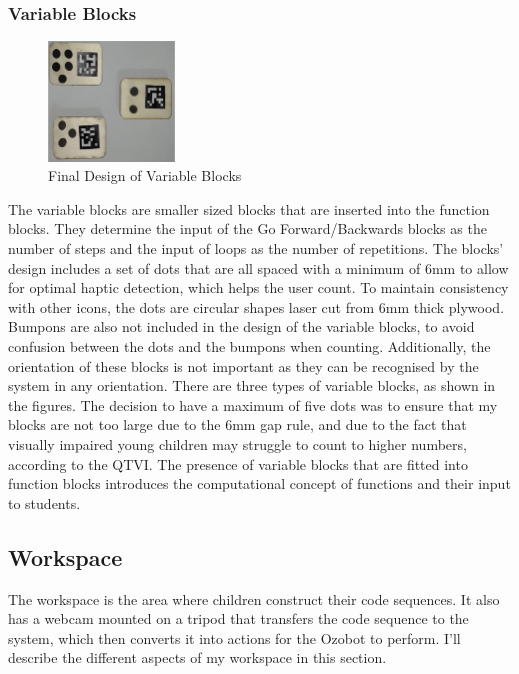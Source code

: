 \documentclass[oneside,%
                    author={Malak Hajji},
                    degree={BSc},
                    title={Designing An Accessible Computational Toolkit For Students},
                  subtitle={With Mixed Visual Abilities}]{dissertation}
\begin{document}
\subsubsection{Variable Blocks}
\FloatBarrier
\begin{figure}[h]
    \centering
    \includegraphics[width=0.3\textwidth]{thesis/finalvariable.eps}
    \caption{Final Design of Variable Blocks}
    \label{fig-variables}
\end{figure}
\FloatBarrier
The variable blocks are smaller sized blocks that are inserted into the function blocks. They determine the input of the Go Forward/Backwards blocks as the number of steps and the input of loops as the number of repetitions. The blocks' design includes a set of dots that are all spaced with a minimum of 6mm to allow for optimal haptic detection, which helps the user count. To maintain consistency with other icons, the dots are circular shapes laser cut from 6mm thick plywood. Bumpons are also not included in the design of the variable blocks, to avoid confusion between the dots and the bumpons when counting. Additionally, the orientation of these blocks is not important as they can be recognised by the system in any orientation. There are three types of variable blocks, as shown in the figures. The decision to have a maximum of five dots was to ensure that my blocks are not too large due to the 6mm gap rule, and due to the fact that visually impaired young children may struggle to count to higher numbers, according to the QTVI. The presence of variable blocks that are fitted into function blocks introduces the computational concept of functions and their input to students. 

\subsection{Workspace}
The workspace is the area where children construct their code sequences. It also has a webcam mounted on a tripod that transfers the code sequence to the system, which then converts it into actions for the Ozobot to perform. I'll describe the different aspects of my workspace in this section.
\end{document}
